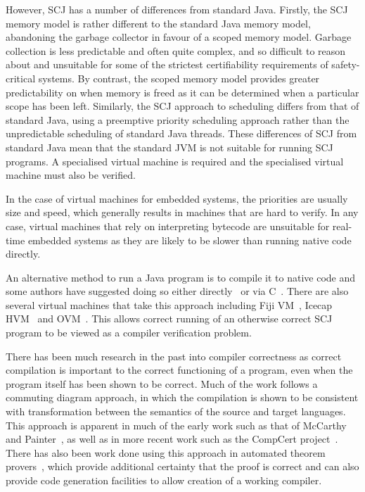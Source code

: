 \documentclass[a4paper,10pt]{article}
\begin{document}
However, SCJ has a number of differences from standard Java. Firstly, the SCJ
memory model is rather different to the standard Java memory model, abandoning
the garbage collector in favour of a scoped memory model.  Garbage collection is
less predictable and often quite complex, and so difficult to reason about and
unsuitable for some of the strictest certifiability requirements of
safety-critical systems.  By contrast, the scoped memory model provides greater
predictability on when memory is freed as it can be determined when a particular
scope has been left.  Similarly, the SCJ approach to scheduling differs from
that of standard Java, using a preemptive priority scheduling approach rather
than the unpredictable scheduling of standard Java threads.  These differences
of SCJ from standard Java mean that the standard JVM is not suitable for running
SCJ programs.  A specialised virtual machine is required and the specialised
virtual machine must also be verified.

In the case of virtual machines for embedded systems, the priorities are usually
size and speed, which generally results in machines that are hard to verify.  In
any case, virtual machines that rely on interpreting bytecode are unsuitable for
real-time embedded systems as they are likely to be slower than running native
code directly.

An alternative method to run a Java program is to compile it to native code and
some authors have suggested doing so either directly~\cite{schultz2003} or via
C~\cite{varma2004}. There are also several virtual machines that take this
approach including Fiji VM~\cite{pizlo2009}, Icecap HVM~\cite{sondergaard2012}
and OVM~\cite{armbruster2007}.  This allows correct running of an otherwise
correct SCJ program to be viewed as a compiler verification problem.

There has been much research in the past into compiler correctness as correct
compilation is important to the correct functioning of a program, even when the
program itself has been shown to be correct.  Much of the work follows a
commuting diagram approach, in which the compilation is shown to be consistent
with transformation between the semantics of the source and target
languages\cite{morris1973, thatcher1979}. This approach is apparent in much of
the early work such as that of McCarthy and Painter~\cite{mccarthy1967}, as well
as in more recent work such as the CompCert project~\cite{leroy2009a,
  leroy2009b}. There has also been work done using this approach in automated
theorem provers~\cite{klein2006, milner1972, nipkow2000}, which provide
additional certainty that the proof is correct and can also provide code
generation facilities to allow creation of a working compiler.
\end{document}
